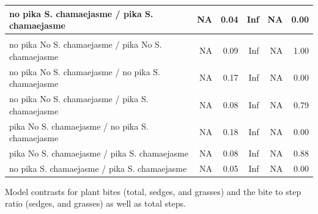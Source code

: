 \documentclass[
  letterpaper,
  DIV=11,
  numbers=noendperiod]{scrartcl}
\begin{document}
\begin{supptbl}
{\begin{table}
\begin{tabular*}{\linewidth}{@{\extracolsep{\fill}}lrrrrr}
no pika S. chamaejasme / pika S. chamaejasme & NA & 0.04 & Inf & NA & 0.00 \\ 
\midrule\addlinespace[2.5pt]
\multicolumn{6}{l}{grass bite steps} \\[2.5pt] 
\midrule\addlinespace[2.5pt]
no pika No S. chamaejasme / pika No S. chamaejasme & NA & 0.09 & Inf & NA & 1.00 \\ 
no pika No S. chamaejasme / no pika S. chamaejasme & NA & 0.17 & Inf & NA & 0.00 \\ 
no pika No S. chamaejasme / pika S. chamaejasme & NA & 0.08 & Inf & NA & 0.79 \\ 
pika No S. chamaejasme / no pika S. chamaejasme & NA & 0.18 & Inf & NA & 0.00 \\ 
pika No S. chamaejasme / pika S. chamaejasme & NA & 0.08 & Inf & NA & 0.88 \\ 
no pika S. chamaejasme / pika S. chamaejasme & NA & 0.05 & Inf & NA & 0.00 \\ 
\bottomrule
\end{tabular*}
\end{table}

}

\caption{\label{supptbl-yak-foraging-efficiency-contrast}Model contrasts
for plant bites (total, sedges, and grasses) and the bite to step ratio
(sedges, and grasses) as well as total steps.}

\end{supptbl}%
\end{document}
